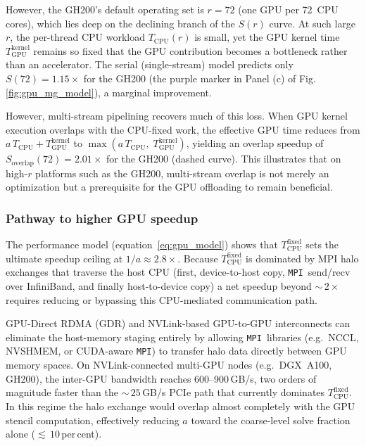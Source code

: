 \documentclass[fleqn,usenatbib]{mnras}
\newcommand{\mpi}[0]{\texttt{MPI}}
\begin{document}
However, the GH200's default operating set is $r = 72$ (one GPU per 72~CPU cores), which lies deep on the declining branch of the $S(r)$ curve.  At such large $r$, the per-thread CPU workload $T_{\mathrm{CPU}}(r)$ is small, yet the GPU kernel time $T_{\mathrm{GPU}}^{\mathrm{kernel}}$ remains so fixed that the GPU contribution becomes a bottleneck rather than an accelerator.  The serial (single-stream) model predicts only $S(72) = 1.15\times$ for the GH200 (the purple marker in Panel (c) of Fig. \ref{fig:gpu_mg_model}), a marginal improvement.

However, multi-stream pipelining recovers much of this loss.  When GPU
kernel execution overlaps with the CPU-fixed work, the effective
GPU time reduces from
$a \, T_{\mathrm{CPU}} + T_{\mathrm{GPU}}^{\mathrm{kernel}}$
to $\max(a \, T_{\mathrm{CPU}},\;
T_{\mathrm{GPU}}^{\mathrm{kernel}})$, yielding an overlap
speedup of $S_{\mathrm{overlap}}(72) = 2.01\times$ for the
GH200 (dashed curve).  This illustrates that on high-$r$
platforms such as the GH200, multi-stream overlap is not merely
an optimization but a prerequisite for the GPU offloading to
remain beneficial.

\subsubsection{Pathway to higher GPU speedup}

The performance model (equation~\ref{eq:gpu_model}) shows that
$T_{\mathrm{CPU}}^{\mathrm{fixed}}$ sets the ultimate speedup
ceiling at $1/a \approx 2.8\times$.  Because
$T_{\mathrm{CPU}}^{\mathrm{fixed}}$ is dominated by MPI halo
exchanges that traverse the host CPU (first, device-to-host copy, \mpi\
send/recv over InfiniBand, and finally host-to-device copy) a net speedup
beyond ${\sim}\,2\times$ requires reducing or bypassing this
CPU-mediated communication path.

GPU-Direct RDMA (GDR) and NVLink-based GPU-to-GPU interconnects
can eliminate the host-memory staging entirely by allowing
\mpi\ libraries (e.g.\ NCCL, NVSHMEM, or CUDA-aware \mpi) to
transfer halo data directly between GPU memory spaces.  On
NVLink-connected multi-GPU nodes (e.g.\ DGX~A100, GH200), the
inter-GPU bandwidth reaches 600--900\,GB/s, two orders of magnitude
faster than the ${\sim}\,25$\,GB/s PCIe path that currently
dominates $T_{\mathrm{CPU}}^{\mathrm{fixed}}$.  In this regime the
halo exchange would overlap almost completely with the GPU stencil
computation, effectively reducing $a$ toward the coarse-level solve
fraction alone (${\lesssim}\,10$\,per\,cent).
\end{document}
